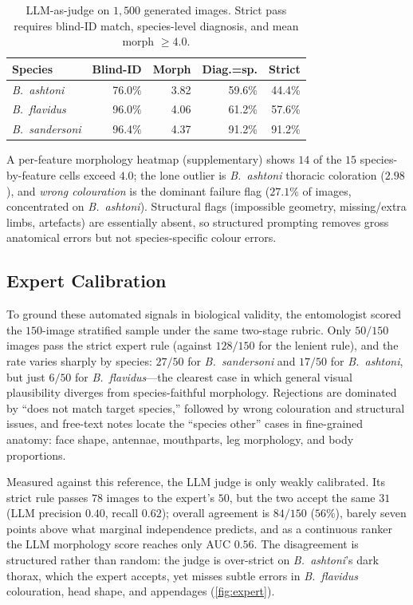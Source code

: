 \documentclass[runningheads]{llncs}
\begin{document}
\begin{table}[t]
  \caption{LLM-as-judge on $1{,}500$ generated images. Strict pass
  requires blind-ID match, species-level diagnosis, and mean morph
  $\geq 4.0$.}
  \label{tab:llm}
  \centering
  \setlength{\tabcolsep}{6pt}
  \begin{tabular}{@{}lrrrr@{}}
    \toprule
    Species & Blind-ID & Morph & Diag.=sp. & Strict \\
    \midrule
    \emph{B.~ashtoni}    & 76.0\% & 3.82 & 59.6\% & 44.4\% \\
    \emph{B.~flavidus}   & 96.0\% & 4.06 & 61.2\% & 57.6\% \\
    \emph{B.~sandersoni} & 96.4\% & 4.37 & 91.2\% & 91.2\% \\
    \bottomrule
  \end{tabular}
\end{table}

A per-feature morphology heatmap (supplementary) shows $14$ of the $15$
species-by-feature cells exceed $4.0$; the lone outlier is
\emph{B.~ashtoni} thoracic coloration ($2.98$), and \emph{wrong
colouration} is the dominant failure flag ($27.1\%$ of images,
concentrated on \emph{B.~ashtoni}). Structural flags (impossible geometry,
missing/extra limbs, artefacts) are essentially absent, so structured
prompting removes gross anatomical errors but not species-specific
colour errors.

\subsection{Expert Calibration}
\label{sec:expert-results}

To ground these automated signals in biological validity, the
entomologist scored the $150$-image stratified sample under the same
two-stage rubric. Only $50/150$ images pass the strict expert
rule (against $128/150$ for the lenient rule), and the rate varies
sharply by species: $27/50$ for \emph{B.~sandersoni} and $17/50$ for
\emph{B.~ashtoni}, but just $6/50$ for \emph{B.~flavidus}---the clearest
case in which general visual plausibility diverges from species-faithful
morphology. Rejections are dominated by ``does not match target
species,'' followed by wrong colouration and structural issues, and
free-text notes locate the ``species other'' cases in fine-grained
anatomy: face shape, antennae, mouthparts, leg morphology, and body
proportions.

Measured against this reference, the LLM judge is only weakly
calibrated. Its strict rule passes $78$ images to the expert's $50$, but
the two accept the same $31$ (LLM precision $0.40$, recall $0.62$);
overall agreement is $84/150$ ($56\%$), barely seven points above what
marginal independence predicts, and as a continuous ranker the LLM
morphology score reaches only AUC $0.56$. The disagreement is structured
rather than random: the judge is over-strict on \emph{B.~ashtoni}'s dark
thorax, which the expert accepts, yet misses subtle errors in
\emph{B.~flavidus} colouration, head shape, and appendages
(\cref{fig:expert}).
\end{document}

